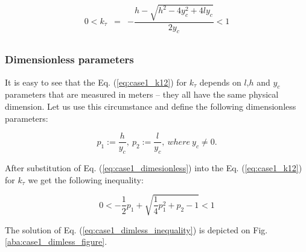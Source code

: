 \documentclass{ws-procs9x6}
\begin{document}
\begin{equation}
\label{eq:case1_k12}
\begin{array}{rcl}
 0 < k_\tau &=& -\dfrac{h - \sqrt{h^2 - 4y_c^2 + 4ly_c}}{2y_c} < 1\\
\end{array}
\end{equation}


%
%

\subsubsection{Dimensionless parameters}

It is easy to see that the Eq. (\ref{eq:case1_k12}) for $k_\tau$ depends on $l$,$h$ and $y_c$ parameters that are measured in meters – they all have the same physical dimension. Let us use this circumstance and define the following dimensionless parameters:

\begin{equation}
\label{eq:case1_dimesionless}
p_1 := \dfrac{h}{y_c},~p_2 := \dfrac{l}{y_c},~where ~y_c \ne 0.
\end{equation}


After substitution of Eq. (\ref{eq:case1_dimesionless}) into the Eq. (\ref{eq:case1_k12}) for $k_\tau$ we get the following inequality:

\begin{equation}
\label{eq:case1_dimless_inequality}
  0< -\dfrac{1}{2} p_1+\sqrt{\dfrac{1}{4} p_1^2+p_2-1}<1
\end{equation}

The solution of Eq. (\ref{eq:case1_dimless_inequality}) is depicted on Fig. \ref{aba:case1_dimless_figure}.
\end{document}
